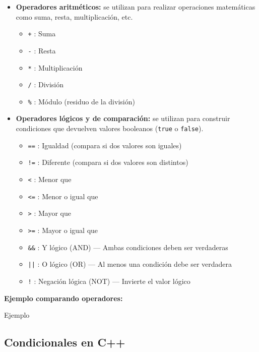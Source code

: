 \documentclass{article}
\newcommand{\cppfile}[2][]{
    \begin{container}{\faCode \space \space  #1}
        
    \end{container}
}
\begin{document}
\begin{itemize}
    \item \textbf{Operadores aritméticos:} se utilizan para realizar operaciones matemáticas como suma, resta, multiplicación, etc.
    \begin{itemize}
        \item \texttt{+}  : Suma
        \item \texttt{-}  : Resta
        \item \texttt{*}  : Multiplicación
        \item \texttt{/}  : División
        \item \texttt{\%} : Módulo (residuo de la división)
    \end{itemize}
    
    \item \textbf{Operadores lógicos y de comparación:} se utilizan para construir condiciones que devuelven valores booleanos (\texttt{true} o \texttt{false}).
    \begin{itemize}
        \item \texttt{==}  : Igualdad (compara si dos valores son iguales)
        \item \texttt{!=}  : Diferente (compara si dos valores son distintos)
        \item \texttt{<}   : Menor que
        \item \texttt{<=}  : Menor o igual que
        \item \texttt{>}   : Mayor que
        \item \texttt{>=}  : Mayor o igual que
        \item \texttt{\&\&} : Y lógico (AND) — Ambas condiciones deben ser verdaderas
        \item \texttt{||}  : O lógico (OR) — Al menos una condición debe ser verdadera
        \item \texttt{!}   : Negación lógica (NOT) — Invierte el valor lógico
    \end{itemize}
\end{itemize}

\textbf{Ejemplo comparando operadores:}

\cppfile[Ejemplo]{codes/operadores_logicos.cpp}



\vspace{1.5cm}

\subsection{Condicionales en C++}
\end{document}
